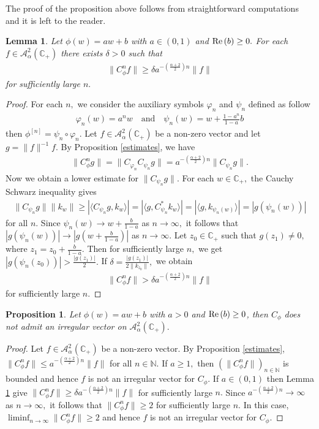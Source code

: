 \documentclass[11pt]{amsart}%
\numberwithin{equation}{section}
\theoremstyle{plain}
\newtheorem{lem}[thm]{Lemma}
\newtheorem{prop}[thm]{Proposition}
\theoremstyle{definition}
\theoremstyle{definition}
\newcommand{\re}{{\rm Re}\,}
\newcommand{\hb}{\mathbb{C}_+}
\newcommand{\Ber}{\mathcal{A}^2_{\alpha}(\hb)}
\begin{document}
The proof of the proposition above follows from straightforward computations and it is
left to the reader.
\begin{lem}\label{lower estimates}
Let $\phi(w)=aw+b$ with $a\in (0,1)$ and $\re(b)\geq 0.$ For each $f\in \Ber$ there exists $\delta>0$ such that 
\begin{align*}
\|C_{\phi}^nf\|\geq \delta a ^{-\left(\frac{\alpha+2}{2}\right)n}\|f\|
\end{align*}
for sufficiently large $n.$  
\end{lem}
\begin{proof}
For each $n,$ we consider the auxiliary symbols $\varphi_n$ and $\psi_n$ defined as follow
\begin{align*}
\varphi_n(w)=a ^nw  \quad \text{and} \quad \psi_n(w)=w+\frac{1-a ^n}{1-a }b
\end{align*}
then $\phi^{[n]}=\psi_n\circ \varphi_n.$ Let $f\in \Ber$ be a non-zero vector and let $g=\|f\|^{-1}f.$ By Proposition \ref{estimates}, we have
\begin{align*}
\|C_{\phi}^ng\|=\|C_{\varphi_n}C_{\psi_n}g\|= a^{-\left(\frac{\alpha+2}{2}\right)n}\|C_{\psi_n}g\|.
\end{align*}
Now we obtain a lower estimate for $\|C_{\psi_n}g\|.$ For each $w\in \hb,$ the Cauchy Schwarz inequality gives
\begin{align*}
\|C_{\psi_n}g\|\|k_w\|\geq |\langle C_{\psi_n}g, k_w\rangle|=|\langle g, C_{\psi_n}^*k_w\rangle|=|\langle g, k_{\psi_n(w)}\rangle|=|g(\psi_n(w))|
\end{align*}
for all $n.$ Since $\psi_n(w)\rightarrow w+\frac{b}{1-a}$ as $n\rightarrow \infty,$ it follows that $|g(\psi_n(w))|\rightarrow |g(w+\frac{b}{1-a})|$ as $n\rightarrow \infty.$ Let $z_0\in \hb$ such that $g(z_1)\neq 0,$ where $z_1=z_0+\frac{b}{1-a}.$ Then for sufficiently large $n,$ we get
$|g(\psi_n(z_0))|>\frac{|g(z_1)|}{2}.$ If $\delta=\frac{|g(z_1)|}{2\|k_{z_0}\|},$ we obtain
\begin{align*}
\|C_{\phi}^nf\|> \delta a ^{-\left(\frac{\alpha+2}{2}\right)n}\|f\|
\end{align*}
for sufficiently large $n.$
\end{proof}

\begin{prop}
Let $\phi(w)=a w+b$ with $a >0$ and $\re(b)\geq0$, then $C_{\phi}$ does not admit an irregular vector on $\Ber.$
\end{prop}
\begin{proof}  Let $f\in \Ber$ be a non-zero vector. By Proposition \ref{estimates},  $\|C_{\phi}^nf\|\leq a ^{-\left(\frac{\alpha+2}{2}\right)n}\|f\|$ for all $n\in \mathbb{N}.$ If $a\geq 1,$ then $(\|C_{\phi}^nf\|)_{n\in \mathbb{N}}$ is bounded and hence $f$ is not an irregular vector for $C_{\phi}$. If $a\in (0,1)$ then Lemma \ref{lower estimates} give $\|C_{\phi}^nf\|\geq \delta a ^{-\left(\frac{\alpha+2}{2}\right)n}\|f\|$ for sufficiently large $n.$  Since $a^{-\left(\frac{\alpha+2}{2}\right)n}\rightarrow \infty$ as $n\rightarrow \infty,$ it follows that $\|C_{\phi}^nf\|\geq 2$ for sufficiently large $n.$ In this case, $\displaystyle\liminf_{n\to \infty}\|C_{\phi}^{n}f\|\geq 2$ and hence $f$ is not an irregular vector for $C_{\phi}$.
\end{proof}
\end{document}
